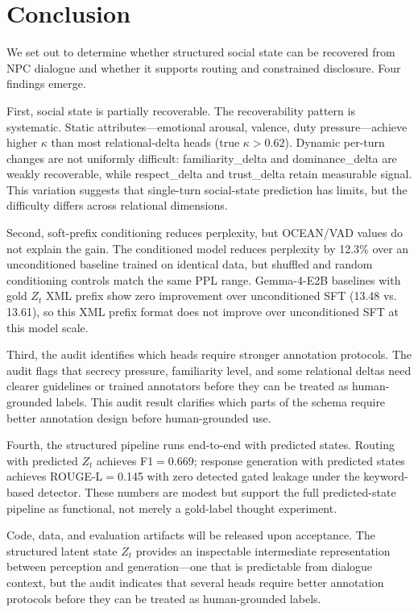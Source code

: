 \documentclass[11pt]{article}
\begin{document}
\section{Conclusion}
\label{sec:conclusion}

We set out to determine whether structured social state can be recovered from NPC dialogue and whether it supports routing and constrained disclosure.
Four findings emerge.

First, social state is partially recoverable. The recoverability pattern is systematic.
Static attributes---emotional arousal, valence, duty pressure---achieve higher $\kappa$ than most relational-delta heads (true $\kappa{>}0.62$).
Dynamic per-turn changes are not uniformly difficult: familiarity\_delta and dominance\_delta are weakly recoverable, while respect\_delta and trust\_delta retain measurable signal.
This variation suggests that single-turn social-state prediction has limits, but the difficulty differs across relational dimensions.

Second, soft-prefix conditioning reduces perplexity, but OCEAN/VAD values do not explain the gain.
The conditioned model reduces perplexity by 12.3\% over an unconditioned baseline trained on identical data, but shuffled and random conditioning controls match the same PPL range.
Gemma-4-E2B baselines with gold $Z_t$ XML prefix show zero improvement over unconditioned SFT (13.48 vs. 13.61), so this XML prefix format does not improve over unconditioned SFT at this model scale.

Third, the audit identifies which heads require stronger annotation protocols.
The audit flags that secrecy pressure, familiarity level, and some relational deltas need clearer guidelines or trained annotators before they can be treated as human-grounded labels.
This audit result clarifies which parts of the schema require better annotation design before human-grounded use.

Fourth, the structured pipeline runs end-to-end with predicted states.
Routing with predicted $Z_t$ achieves F1$=$0.669; response generation with predicted states achieves ROUGE-L$=$0.145 with zero detected gated leakage under the keyword-based detector.
These numbers are modest but support the full predicted-state pipeline as functional, not merely a gold-label thought experiment.

Code, data, and evaluation artifacts will be released upon acceptance.
The structured latent state $Z_t$ provides an inspectable intermediate representation between perception and generation---one that is predictable from dialogue context, but the audit indicates that several heads require better annotation protocols before they can be treated as human-grounded labels.
\end{document}
